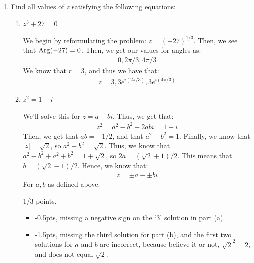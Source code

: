 \begin{enumerate}
    \item Find all values of $z$ satisfying the following equations:
    \begin{enumerate}
        \item $z^3+27 =0$
        \begin{problem}
			We begin by reformulating the problem: $z = (-27)^{1/3}$. Then, we see that $\operatorname{Arg}(-27) = 0$. Then, we get our values for angles as:
			\begin{align*}
				0, 2\pi/3, 4\pi/3
			\end{align*}
			We know that $r = 3$, and thus we have that:
			\begin{align*}
				z = 3, 3e^{i(2\pi/3)}, 3e^{i(4\pi/3)}
			\end{align*}
		\end{problem}
        \item $z^2=1-i$
		\begin{problem}
			We'll solve this for $z = a+bi$. Thus, we get that:
			\begin{align*}
				z^2 = a^2 - b^2 + 2abi = 1-i
			\end{align*}
			Then, we get that $ab = -1/2$, and that $a^2 - b^2 = 1$. Finally, we know that $|z| = \sqrt{2}$, so $a^2 + b^2 = \sqrt{2}$.\gline{}
			Thus, we know that $a^2 - b^2 + a^2 + b^2 = 1 + \sqrt{2}$, so $2a = (\sqrt{2} + 1)/2$.\gline{}
			This means that $b = (\sqrt{2} - 1)/2$. \gline{}
			Hence, we know that:
			\begin{align*}
				z = \pm a - \pm bi
			\end{align*}
			For $a,b$ as defined above. 
		\end{problem}
		\begin{grade}
			1/3 points. 
			\begin{itemize}
				\item -0.5pts, missing a negative sign on the `3' solution in part (a).
				\item -1.5pts, missing the third solution for part (b), and the first two solutions for $a$ and $b$ are incorrect, because believe it or not, $\sqrt{2}^2 = 2$, and does not equal $\sqrt{2}$. 
			\end{itemize}
		\end{grade}
    \end{enumerate}
    

\end{enumerate}

